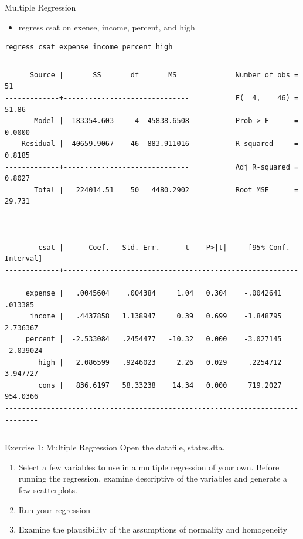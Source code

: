 \documentclass[table,smaller]{beamer}
\begin{document}
\begin{frame}[fragile,label=sec-3-3]{Multiple Regression}
 \begin{itemize}
\item regress csat on exense, income, percent, and high
\end{itemize}


\begin{verbatim}
regress csat expense income percent high
\end{verbatim}


\vspace{-.5em}
\begin{columns}
\begin{block}{}
\begin{verbatim}
      Source |       SS       df       MS              Number of obs =      51
-------------+------------------------------           F(  4,    46) =   51.86
       Model |  183354.603     4  45838.6508           Prob > F      =  0.0000
    Residual |  40659.9067    46  883.911016           R-squared     =  0.8185
-------------+------------------------------           Adj R-squared =  0.8027
       Total |   224014.51    50   4480.2902           Root MSE      =  29.731

------------------------------------------------------------------------------
        csat |      Coef.   Std. Err.      t    P>|t|     [95% Conf. Interval]
-------------+----------------------------------------------------------------
     expense |   .0045604    .004384     1.04   0.304    -.0042641     .013385
      income |   .4437858   1.138947     0.39   0.699    -1.848795    2.736367
     percent |  -2.533084   .2454477   -10.32   0.000    -3.027145   -2.039024
        high |   2.086599   .9246023     2.26   0.029     .2254712    3.947727
       _cons |   836.6197   58.33238    14.34   0.000     719.2027    954.0366
------------------------------------------------------------------------------
\end{verbatim}
\end{block}
\end{columns}
\vspace{.5em}
\end{frame}


\begin{frame}[label=sec-3-4]{Exercise 1: Multiple Regression}
Open the datafile, states.dta.
\begin{enumerate}
\item Select a few variables to use in a multiple regression of your own.  Before running the regression, examine descriptive of the variables and generate a few scatterplots.
\item Run your regression
\item Examine the plausibility of the assumptions of normality and homogeneity
\end{enumerate}
\end{frame}
\end{document}
